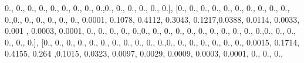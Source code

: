 \documentclass[
]{book}
\newenvironment{Shaded}{\begin{snugshade}}{\end{snugshade}}
\newcommand{\FloatTok}[1]{\textcolor[rgb]{0.00,0.00,0.81}{#1}}
\newcommand{\NormalTok}[1]{#1}
\begin{document}
\begin{Shaded}
\begin{Highlighting}[]
\FloatTok{0.}\NormalTok{, }\FloatTok{0.}\NormalTok{, }\FloatTok{0.}\NormalTok{, }\FloatTok{0.}\NormalTok{, }\FloatTok{0.}\NormalTok{, }\FloatTok{0.}\NormalTok{, }\FloatTok{0.}\NormalTok{, }\FloatTok{0.}\NormalTok{, }\FloatTok{0.}\NormalTok{,}\FloatTok{0.}\NormalTok{, }\FloatTok{0.}\NormalTok{, }\FloatTok{0.}\NormalTok{, }\FloatTok{0.}\NormalTok{, }\FloatTok{0.}\NormalTok{, }\FloatTok{0.}\NormalTok{], [}\FloatTok{0.}\NormalTok{, }\FloatTok{0.}\NormalTok{, }\FloatTok{0.}\NormalTok{, }\FloatTok{0.}\NormalTok{, }\FloatTok{0.}\NormalTok{,}
\FloatTok{0.}\NormalTok{, }\FloatTok{0.}\NormalTok{, }\FloatTok{0.}\NormalTok{, }\FloatTok{0.}\NormalTok{, }\FloatTok{0.}\NormalTok{, }\FloatTok{0.}\NormalTok{,}\FloatTok{0.}\NormalTok{, }\FloatTok{0.}\NormalTok{, }\FloatTok{0.}\NormalTok{, }\FloatTok{0.}\NormalTok{, }\FloatTok{0.}\NormalTok{, }\FloatTok{0.}\NormalTok{, }\FloatTok{0.0001}\NormalTok{, }\FloatTok{0.1078}\NormalTok{, }\FloatTok{0.4112}\NormalTok{, }\FloatTok{0.3043}\NormalTok{,}
\FloatTok{0.1217}\NormalTok{,}\FloatTok{0.0388}\NormalTok{, }\FloatTok{0.0114}\NormalTok{, }\FloatTok{0.0033}\NormalTok{, }\FloatTok{0.001}\NormalTok{ , }\FloatTok{0.0003}\NormalTok{, }\FloatTok{0.0001}\NormalTok{, }\FloatTok{0.}\NormalTok{, }\FloatTok{0.}\NormalTok{, }\FloatTok{0.}\NormalTok{, }\FloatTok{0.}\NormalTok{, }\FloatTok{0.}\NormalTok{,}\FloatTok{0.}\NormalTok{,}
\FloatTok{0.}\NormalTok{, }\FloatTok{0.}\NormalTok{, }\FloatTok{0.}\NormalTok{, }\FloatTok{0.}\NormalTok{, }\FloatTok{0.}\NormalTok{, }\FloatTok{0.}\NormalTok{, }\FloatTok{0.}\NormalTok{, }\FloatTok{0.}\NormalTok{, }\FloatTok{0.}\NormalTok{, }\FloatTok{0.}\NormalTok{,}\FloatTok{0.}\NormalTok{, }\FloatTok{0.}\NormalTok{, }\FloatTok{0.}\NormalTok{, }\FloatTok{0.}\NormalTok{, }\FloatTok{0.}\NormalTok{, }\FloatTok{0.}\NormalTok{], [}\FloatTok{0.}\NormalTok{, }\FloatTok{0.}\NormalTok{, }\FloatTok{0.}\NormalTok{, }\FloatTok{0.}\NormalTok{,}
\FloatTok{0.}\NormalTok{, }\FloatTok{0.}\NormalTok{, }\FloatTok{0.}\NormalTok{, }\FloatTok{0.}\NormalTok{, }\FloatTok{0.}\NormalTok{, }\FloatTok{0.}\NormalTok{, }\FloatTok{0.}\NormalTok{,}\FloatTok{0.}\NormalTok{, }\FloatTok{0.}\NormalTok{, }\FloatTok{0.}\NormalTok{, }\FloatTok{0.}\NormalTok{, }\FloatTok{0.}\NormalTok{, }\FloatTok{0.}\NormalTok{, }\FloatTok{0.}\NormalTok{, }\FloatTok{0.0015}\NormalTok{, }\FloatTok{0.1714}\NormalTok{, }\FloatTok{0.4155}\NormalTok{,}
\FloatTok{0.264}\NormalTok{ ,}\FloatTok{0.1015}\NormalTok{, }\FloatTok{0.0323}\NormalTok{, }\FloatTok{0.0097}\NormalTok{, }\FloatTok{0.0029}\NormalTok{, }\FloatTok{0.0009}\NormalTok{, }\FloatTok{0.0003}\NormalTok{, }\FloatTok{0.0001}\NormalTok{, }\FloatTok{0.}\NormalTok{, }\FloatTok{0.}\NormalTok{, }\FloatTok{0.}\NormalTok{,}

\end{Highlighting}
\end{Shaded}
\end{document}
